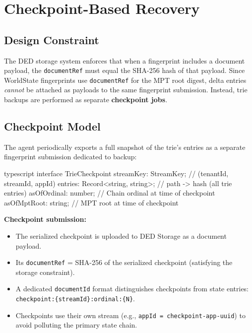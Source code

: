 \documentclass[11pt,a4paper]{article}
\begin{document}
\section{Checkpoint-Based Recovery}

\subsection{Design Constraint}

The DED storage system enforces that when a fingerprint includes a document payload, the
\texttt{documentRef} must equal the SHA-256 hash of that payload. Since WorldState
fingerprints use \texttt{documentRef} for the MPT root digest, delta entries \emph{cannot}
be attached as payloads to the same fingerprint submission. Instead, trie backups are
performed as separate \textbf{checkpoint jobs}.

\subsection{Checkpoint Model}

The agent periodically exports a full snapshot of the trie's entries as a separate
fingerprint submission dedicated to backup:

\begin{codebox}{typescript}
interface TrieCheckpoint {
  streamKey: StreamKey;       // (tenantId, streamId, appId)
  entries: Record<string, string>;  // path -> hash (all trie entries)
  asOfOrdinal: number;       // Chain ordinal at time of checkpoint
  asOfMptRoot: string;       // MPT root at time of checkpoint
}
\end{codebox}

\textbf{Checkpoint submission:}
\begin{itemize}
  \item The serialized checkpoint is uploaded to DED Storage as a document payload.
  \item Its \texttt{documentRef} = SHA-256 of the serialized checkpoint (satisfying the
    storage constraint).
  \item A dedicated \texttt{documentId} format distinguishes checkpoints from state
    entries: \texttt{checkpoint:\{streamId\}:ordinal:\{N\}}.
  \item Checkpoints use their own stream (e.g., \texttt{appId = checkpoint-app-uuid}) to
    avoid polluting the primary state chain.
\end{itemize}
\end{document}
